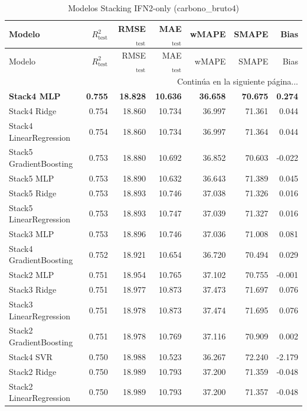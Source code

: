 \begin{longtable}{lrrrrrr}
    \caption{Modelos Stacking IFN2-only (carbono_bruto4)}
    \label{tab:stack_ifn2_carbono_bruto4} \\
    \toprule
    Modelo & $R^2_{\text{test}}$ & RMSE$_{\text{test}}$ & MAE$_{\text{test}}$ & wMAPE & SMAPE & Bias \\
    \midrule
    \endfirsthead
    \toprule
    Modelo & $R^2_{\text{test}}$ & RMSE$_{\text{test}}$ & MAE$_{\text{test}}$ & wMAPE & SMAPE & Bias \\
    \midrule
    \endhead
    \midrule
    \multicolumn{7}{r}{{Continúa en la siguiente página...}} \\
    \endfoot
    \bottomrule
    \endlastfoot
    \textbf{Stack4 MLP} & \textbf{0.755} & \textbf{18.828} & \textbf{10.636} & \textbf{36.658} & \textbf{70.675} & \textbf{0.274} \\
    Stack4 Ridge & 0.754 & 18.860 & 10.734 & 36.997 & 71.361 & 0.044 \\
    Stack4 LinearRegression & 0.754 & 18.860 & 10.734 & 36.997 & 71.364 & 0.044 \\
    Stack5 GradientBoosting & 0.753 & 18.880 & 10.692 & 36.852 & 70.603 & -0.022 \\
    Stack5 MLP & 0.753 & 18.890 & 10.632 & 36.643 & 71.389 & 0.045 \\
    Stack5 Ridge & 0.753 & 18.893 & 10.746 & 37.038 & 71.326 & 0.016 \\
    Stack5 LinearRegression & 0.753 & 18.893 & 10.747 & 37.039 & 71.327 & 0.016 \\
    Stack3 MLP & 0.753 & 18.896 & 10.746 & 37.036 & 71.008 & 0.081 \\
    Stack4 GradientBoosting & 0.752 & 18.921 & 10.654 & 36.720 & 70.494 & 0.029 \\
    Stack2 MLP & 0.751 & 18.954 & 10.765 & 37.102 & 70.755 & -0.001 \\
    Stack3 Ridge & 0.751 & 18.977 & 10.873 & 37.473 & 71.697 & 0.076 \\
    Stack3 LinearRegression & 0.751 & 18.978 & 10.873 & 37.474 & 71.695 & 0.076 \\
    Stack2 GradientBoosting & 0.751 & 18.978 & 10.769 & 37.116 & 70.909 & 0.002 \\
    Stack4 SVR & 0.750 & 18.988 & 10.523 & 36.267 & 72.240 & -2.179 \\
    Stack2 Ridge & 0.750 & 18.989 & 10.793 & 37.200 & 71.359 & -0.048 \\
    Stack2 LinearRegression & 0.750 & 18.989 & 10.793 & 37.200 & 71.357 & -0.048 \\

\end{longtable}
